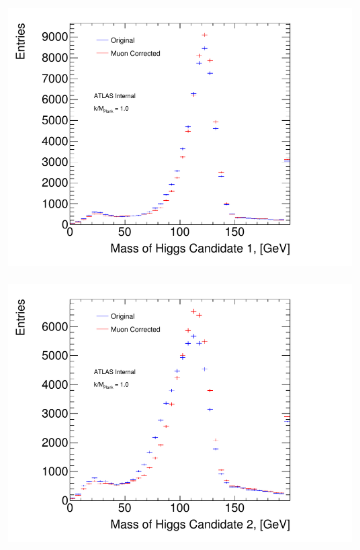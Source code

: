 \begin{figure}
\begin{center}
    \captionsetup{justification=centering}
    \begin{subfigure}[b]{0.45\textwidth}
        \includegraphics[width=\textwidth]{figures/boosted/muons/h1_mass_dbl.pdf}
        \caption{\mleadJ}
        \label{fig:boosted-muons-signal-leadj}
    \end{subfigure}
    \quad
    \begin{subfigure}[b]{0.45\textwidth}
        \includegraphics[width=\textwidth]{figures/boosted/muons/h2_mass_dbl.pdf}
        \caption{\msublJ}
        \label{fig:boosted-muons-signal-sublj}
    \end{subfigure}\\

\end{center}
\end{figure}
